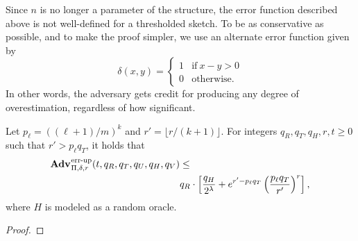 Since $n$ is no longer a parameter of the structure, the error function
described above is not well-defined for a thresholded sketch. To be as
conservative as possible, and to make the proof simpler, we use an alternate
error function given by
\begin{equation}
  \delta(x, y) =
  \begin{cases}
    1 & \text{if}\ x - y > 0 \\
    0 & \text{otherwise.}
  \end{cases}
\end{equation}
In other words, the adversary gets credit for producing any degree of
overestimation, regardless of how significant.

\begin{theorem}\label{thm:scms-erreps-th}
Let $p_\ell = ((\ell+1)/m)^k$ and $r' = \lfloor r/(k+1) \rfloor$. For integers $q_R, q_T, q_H, r, t \geq 0$ such
that $r' > p_\ell q_T$, it holds that
  \begin{equation*}
  \begin{aligned}
    \Adv{\errep}_{\Pi,\delta,r}(t, q_R,q_T,q_U,q_H,q_V) &\leq \\
     & q_R \cdot \left[\frac{q_H}{2^\lambda} + e^{r'-p_\ell q_T}\left(\frac{p_\ell q_T}{r'}\right)^r\right],
  \end{aligned}
\end{equation*}
where $H$ is modeled as a random oracle.
\end{theorem}

\begin{proof}
  
\end{proof}